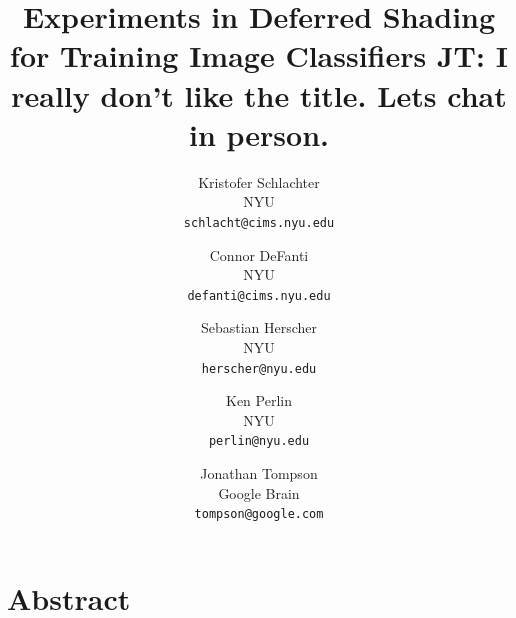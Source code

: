 \documentclass[10pt,twocolumn,letterpaper]{article}
\newcommand{\tompson}[1]{{\color{green} JT: #1}}
\begin{document}
\title{Experiments in Deferred Shading for Training Image Classifiers \tompson{I really don't like the title. Lets chat in person.}}

\author{Kristofer Schlachter\\
NYU\\
{\tt\small schlacht@cims.nyu.edu}
\and
Connor DeFanti\\
NYU\\
{\tt\small defanti@cims.nyu.edu}
\and
Sebastian Herscher\\
NYU\\
{\tt\small herscher@nyu.edu}
\and
Ken Perlin\\
NYU\\
{\tt\small perlin@nyu.edu}
\and
Jonathan Tompson\\
Google Brain\\
{\tt\small tompson@google.com}
}

\maketitle
\maketitle

\section{Abstract}
\end{document}
